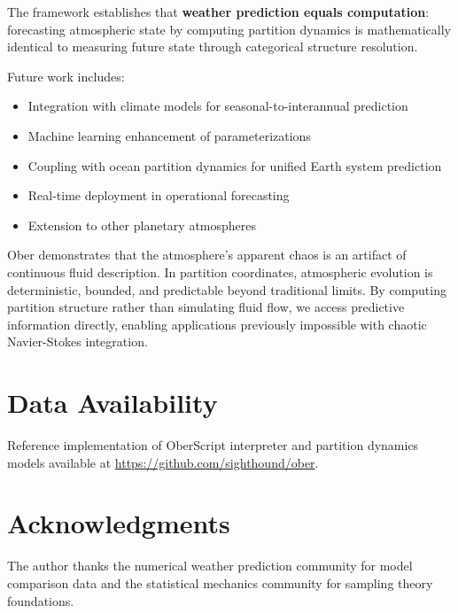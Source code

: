 \documentclass[twocolumn,10pt,a4paper]{article}
\theoremstyle{definition}
\theoremstyle{remark}
\begin{document}
The framework establishes that \textbf{weather prediction equals computation}: forecasting atmospheric state by computing partition dynamics is mathematically identical to measuring future state through categorical structure resolution.

Future work includes:
\begin{itemize}
    \item Integration with climate models for seasonal-to-interannual prediction
    \item Machine learning enhancement of parameterizations
    \item Coupling with ocean partition dynamics for unified Earth system prediction
    \item Real-time deployment in operational forecasting
    \item Extension to other planetary atmospheres
\end{itemize}

Ober demonstrates that the atmosphere's apparent chaos is an artifact of continuous fluid description. In partition coordinates, atmospheric evolution is deterministic, bounded, and predictable beyond traditional limits. By computing partition structure rather than simulating fluid flow, we access predictive information directly, enabling applications previously impossible with chaotic Navier-Stokes integration.

\section*{Data Availability}

Reference implementation of OberScript interpreter and partition dynamics models available at \url{https://github.com/sighthound/ober}.

\section*{Acknowledgments}

The author thanks the numerical weather prediction community for model comparison data and the statistical mechanics community for sampling theory foundations.
\end{document}
